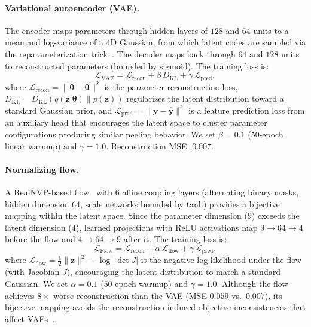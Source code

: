 \paragraph{Variational autoencoder (VAE).}
The encoder maps parameters through hidden layers of $128$ and $64$ units to a mean and log-variance of a $4$D Gaussian, from which latent codes are sampled via the reparameterization trick~\cite{kingma2014vae}. The decoder maps back through $64$ and $128$ units to reconstructed parameters (bounded by sigmoid). The training loss is:
\begin{equation}
    \mathcal{L}_{\text{VAE}} = \mathcal{L}_{\text{recon}} + \beta \, D_{\text{KL}} + \gamma \, \mathcal{L}_{\text{pred}},
\label{eq:vae_loss}
\end{equation}
where $\mathcal{L}_{\text{recon}} = \|\boldsymbol{\theta} - \hat{\boldsymbol{\theta}}\|^2$ is the parameter reconstruction loss, $D_{\text{KL}} = D_{\text{KL}}(q(\mathbf{z}|\boldsymbol{\theta}) \| p(\mathbf{z}))$ regularizes the latent distribution toward a standard Gaussian prior, and $\mathcal{L}_{\text{pred}} = \|\mathbf{y} - \hat{\mathbf{y}}\|^2$ is a feature prediction loss from an auxiliary head that encourages the latent space to cluster parameter configurations producing similar peeling behavior. We set $\beta{=}0.1$ ($50$-epoch linear warmup) and $\gamma{=}1.0$. Reconstruction MSE: $0.007$.

\paragraph{Normalizing flow.}
A RealNVP-based flow~\cite{dinh2017realnvp} with $6$ affine coupling layers (alternating binary masks, hidden dimension $64$, scale networks bounded by tanh) provides a bijective mapping within the latent space. Since the parameter dimension ($9$) exceeds the latent dimension ($4$), learned projections with ReLU activations map $9 \to 64 \to 4$ before the flow and $4 \to 64 \to 9$ after it. The training loss is:
\begin{equation}
    \mathcal{L}_{\text{Flow}} = \mathcal{L}_{\text{recon}} + \alpha \, \mathcal{L}_{\text{flow}} + \gamma \, \mathcal{L}_{\text{pred}},
\label{eq:flow_loss}
\end{equation}
where $\mathcal{L}_{\text{flow}} = \tfrac{1}{2}\|\mathbf{z}\|^2 - \log|\det J|$ is the negative log-likelihood under the flow (with Jacobian $J$), encouraging the latent distribution to match a standard Gaussian. We set $\alpha{=}0.1$ ($50$-epoch warmup) and $\gamma{=}1.0$. Although the flow achieves $8\times$ worse reconstruction than the VAE (MSE $0.059$ vs.\ $0.007$), its bijective mapping avoids the reconstruction-induced objective inconsistencies that affect VAEs~\cite{lee2025nfbo}.

